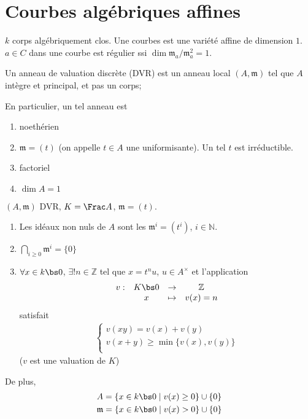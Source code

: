     \section{Courbes algébriques affines}
        $k$ corps algébriquement clos. Une courbes est une variété affine de dimension $1$. $a \in C$ dans une courbe est régulier ssi $\dim \mathfrak{m}_a/\mathfrak{m}_a^2 = 1$.
        \begin{defi}
            Un anneau de valuation discrète (DVR) est un anneau local $(A, \mathfrak{m})$ tel que $A$ intègre et principal, et pas un corps;
        \end{defi}
        En particulier, un tel anneau est
        \begin{enumerate}
            \item noethérien
            \item $\mathfrak{m} = (t)$ (on appelle $t \in A$ une uniformisante). Un tel $t$ est irréductible.
            \item factoriel 
            \item $\dim A = 1$ \\
        \end{enumerate}
        \begin{prop}
            $(A, \mathfrak{m})$ DVR, $K = \Frac A$, $\mathfrak{m} = (t)$.
            \begin{enumerate}
                \item Les idéaux non nuls de $A$ sont les $\mathfrak{m}^i = (t^i)$, $i \in \mathbb{N}$.
                \item $\bigcap_{i \geq 0} \mathfrak{m}^i = \{0\}$
                \item $\forall x \in k \bs 0$, $\exists ! n \in \mathbb{Z}$ tel que $x = t^nu$, $u \in A^\times$ et l'application
                \begin{align*}
                    \begin{array}{cccc}
                        v : & K \bs 0 & \to & \mathbb{Z} \\
                        & x & \mapsto & v(x) = n \\
                    \end{array}
                \end{align*}
                satisfait 
                \begin{align*}
                    \begin{cases}
                        v(xy) = v(x) + v(y) \\
                        v(x + y) \geq \min \{v(x), v(y)\} \\
                    \end{cases}
                \end{align*}
                ($v$ est une valuation de $K$)
            \end{enumerate}
            De plus,
            \begin{align*}
                &A = \{x \in k \bs 0 \mid v(x) \geq 0\} \cup \{0\} \\
                &\mathfrak{m} = \{x \in k \bs 0 \mid v(x) > 0\} \cup \{0\} \\
            \end{align*}
        \end{prop}
